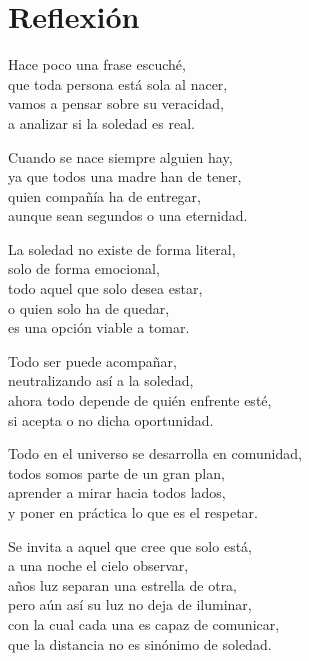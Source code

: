 \section*{Reflexión}
\label{Reflexion}

\vspace{1em}
\begin{center}
Hace poco una frase escuché,\\ 
que toda persona está sola al nacer,\\ 
vamos a pensar sobre su veracidad,\\ 
a analizar si la soledad es real.

\vspace{1em} 
Cuando se nace siempre alguien hay,\\ 
ya que todos una madre han de tener,\\ 
quien compañía ha de entregar,\\ 
aunque sean segundos o una eternidad.

\vspace{1em} 
La soledad no existe de forma literal,\\ 
solo de forma emocional,\\ 
todo aquel que solo desea estar,\\ 
o quien solo ha de quedar,\\ 
es una opción viable a tomar.

\vspace{1em} 
Todo ser puede acompañar,\\ 
neutralizando así a la soledad,\\ 
ahora todo depende de quién enfrente esté,\\ 
si acepta o no dicha oportunidad.

\vspace{1em} 
Todo en el universo se desarrolla en comunidad,\\ 
todos somos parte de un gran plan,\\ 
aprender a mirar hacia todos lados,\\ 
y poner en práctica lo que es el respetar.

\vspace{1em} 
Se invita a aquel que cree que solo está,\\ 
a una noche el cielo observar,\\ 
años luz separan una estrella de otra,\\ 
pero aún así su luz no deja de iluminar,\\ 
con la cual cada una es capaz de comunicar,\\ 
que la distancia no es sinónimo de soledad.


\end{center}
